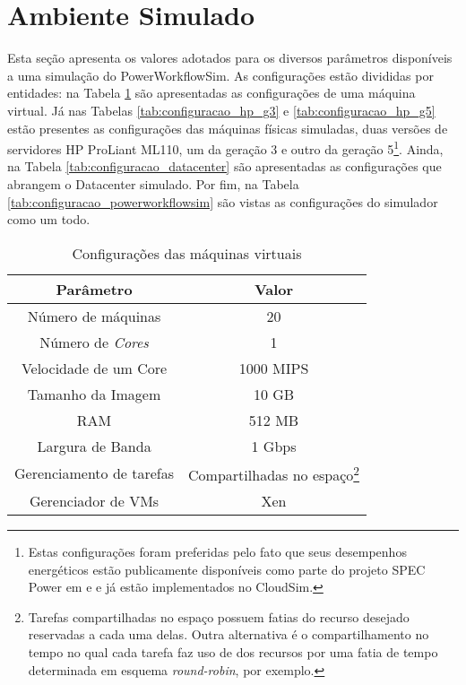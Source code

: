 \section{Ambiente Simulado}
\label{sec:ambiente_simulado}
Esta seção apresenta os valores adotados para os diversos parâmetros disponíveis
a uma simulação do PowerWorkflowSim. As configurações estão divididas
por entidades: na Tabela \ref{tab:configuracao_vm} são apresentadas as
configurações de uma máquina virtual. Já nas Tabelas \ref{tab:configuracao_hp_g3}
e \ref{tab:configuracao_hp_g5} estão presentes as configurações das máquinas
físicas simuladas, duas versões de servidores HP ProLiant ML110, um da geração 3
e outro da geração 5\footnote{Estas configurações foram preferidas pelo fato que 
seus desempenhos energéticos estão publicamente disponíveis como parte do
projeto SPEC Power em \cite{spec:proliant_ml110_g3} e
\cite{spec:proliant_ml110_g5} e já estão implementados no CloudSim.}. Ainda, na
Tabela \ref{tab:configuracao_datacenter} são apresentadas as configurações que
abrangem o Datacenter simulado. Por fim, na Tabela
\ref{tab:configuracao_powerworkflowsim} são vistas as configurações
do simulador como um todo.

\begin{savenotes}
\begin{table}
	\centering
    \begin{tabular}{|c|c|}
    \hline
    \textbf{Parâmetro}     & \textbf{Valor}     \\ \hline
    Número de máquinas     & 20        \\
    Número de \emph{Cores} & 1         \\
    Velocidade de um Core  & 1000 MIPS \\
    Tamanho da Imagem      & 10 GB  \\
    RAM                    & 512 MB    \\
    Largura de Banda       & 1 Gbps \\
    Gerenciamento de tarefas & Compartilhadas no espaço\footnote{Tarefas
    compartilhadas no espaço possuem fatias do recurso desejado
    reservadas a cada uma delas. Outra alternativa é o compartilhamento no tempo
    no qual cada tarefa faz uso de dos recursos por uma fatia de tempo
    determinada em esquema \emph{round-robin}, por exemplo.} \\
    Gerenciador de VMs     & Xen       \\     \hline
    \end{tabular}
    \caption {Configurações das máquinas virtuais}
    \label{tab:configuracao_vm}
\end{table}
\end{savenotes}

